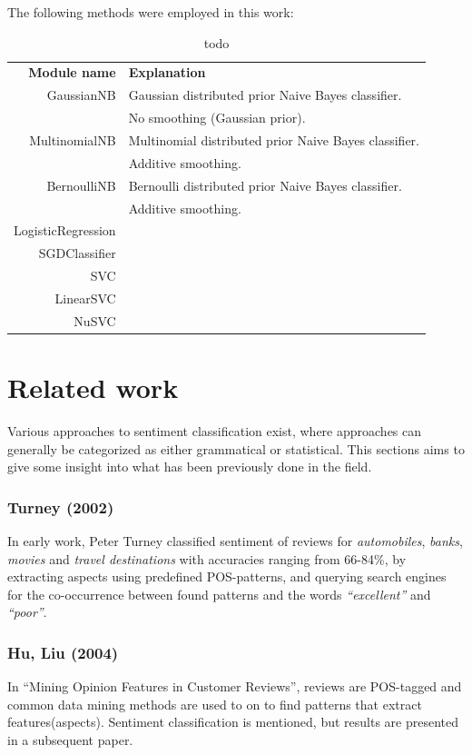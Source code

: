 \documentclass[a4paper,11pt]{kth-mag}
\begin{document}
The following methods were employed in this work:

\begin{table}[h]
  \centering
  \begin{tabular}{ r l }
    \textbf{Module name} & \textbf{Explanation}\\
    GaussianNB & Gaussian distributed prior Naive Bayes classifier.\\
         & No smoothing (Gaussian prior).\\
    MultinomialNB & Multinomial distributed prior Naive Bayes classifier. \\
         & Additive smoothing.\\
    BernoulliNB & Bernoulli distributed prior Naive Bayes classifier.\\
         & Additive smoothing.\\
    LogisticRegression & \\
    SGDClassifier & \\
    SVC & \\
    LinearSVC & \\
    NuSVC & \\
  \end{tabular}
  \caption{todo}
  \label{tab:scikit_classifiers}
\end{table}


\newpage
\section{Related work}
Various approaches to sentiment classification exist, where approaches can generally be categorized as either grammatical\cite{todo} or statistical\cite{todo}. This sections aims to give some insight into what has been previously done in the field.

\subsubsection{Turney (2002)}
In early work, Peter Turney classified sentiment of reviews for \emph{automobiles}, \emph{banks}, \emph{movies} and \emph{travel destinations} with accuracies ranging from 66-84\%, by extracting aspects using predefined POS-patterns, and querying search engines for the co-occurrence between found patterns and the words \emph{``excellent''} and \emph{``poor''}.

\subsubsection{Hu, Liu (2004)}
In ``Mining Opinion Features in Customer Reviews'', reviews are POS-tagged and common data mining methods are used to on to find patterns that extract features(aspects). Sentiment classification is mentioned, but results are presented in a subsequent paper.
\end{document}
